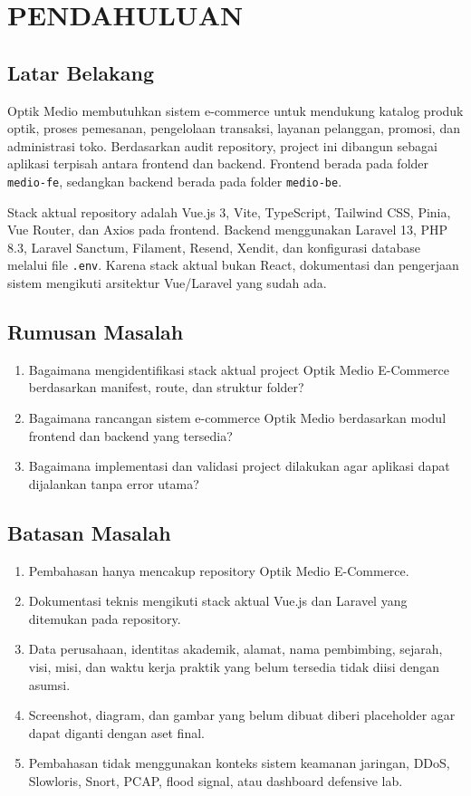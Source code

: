 \documentclass[12pt,a4paper]{report}
\begin{document}
\chapter{PENDAHULUAN}
\section{Latar Belakang}
Optik Medio membutuhkan sistem e-commerce untuk mendukung katalog produk optik, proses pemesanan, pengelolaan transaksi, layanan pelanggan, promosi, dan administrasi toko. Berdasarkan audit repository, project ini dibangun sebagai aplikasi terpisah antara frontend dan backend. Frontend berada pada folder \texttt{medio-fe}, sedangkan backend berada pada folder \texttt{medio-be}.

Stack aktual repository adalah Vue.js 3, Vite, TypeScript, Tailwind CSS, Pinia, Vue Router, dan Axios pada frontend. Backend menggunakan Laravel 13, PHP 8.3, Laravel Sanctum, Filament, Resend, Xendit, dan konfigurasi database melalui file \texttt{.env}. Karena stack aktual bukan React, dokumentasi dan pengerjaan sistem mengikuti arsitektur Vue/Laravel yang sudah ada.

\section{Rumusan Masalah}
\begin{enumerate}
    \item Bagaimana mengidentifikasi stack aktual project Optik Medio E-Commerce berdasarkan manifest, route, dan struktur folder?
    \item Bagaimana rancangan sistem e-commerce Optik Medio berdasarkan modul frontend dan backend yang tersedia?
    \item Bagaimana implementasi dan validasi project dilakukan agar aplikasi dapat dijalankan tanpa error utama?
\end{enumerate}

\section{Batasan Masalah}
\begin{enumerate}
    \item Pembahasan hanya mencakup repository Optik Medio E-Commerce.
    \item Dokumentasi teknis mengikuti stack aktual Vue.js dan Laravel yang ditemukan pada repository.
    \item Data perusahaan, identitas akademik, alamat, nama pembimbing, sejarah, visi, misi, dan waktu kerja praktik yang belum tersedia tidak diisi dengan asumsi.
    \item Screenshot, diagram, dan gambar yang belum dibuat diberi placeholder agar dapat diganti dengan aset final.
    \item Pembahasan tidak menggunakan konteks sistem keamanan jaringan, DDoS, Slowloris, Snort, PCAP, flood signal, atau dashboard defensive lab.
\end{enumerate}
\end{document}
